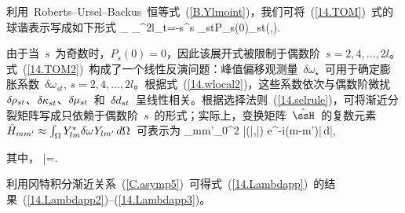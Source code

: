 利用~Roberts--Ursel--Backus~恒等式~(\ref{B.Ylmoint})，我们可将~(\ref{14.TOM})~式的球谐表示写成如下形式
\eq \label{14.TOM2}
\delta\omega_{\star}\approx
\sum_{}^{2l}\sum_{t=-s}^s
\delta\omega_{st}P_s(0)\sY_{st}(\otheta,\ophi).
\en

由于当~$s$~为奇数时，$P_s(0)=0$，因此该展开式被限制于偶数阶~$s=2,4,\ldots,2l$。式~(\ref{14.TOM2})~构成了一个线性反演问题：峰值偏移观测量~$\delta\omega_{\star}$~可用于确定膨胀系数~$\delta\omega_{st}$, $s=2,4,\ldots,2l$。根据式~(\ref{14.wlocal2})，这些系数依次与偶数阶微扰~$\delta\hspace{-0.2 mm}\rho_{st}$、$\delta\hspace{-0.1 mm}\kappa_{st}$、$\delta\hspace{-0.2 mm}
\mu_{st}$~和~$\delta\hspace{-0.1 mm}d_{st}$~呈线性相关。根据选择法则~(\ref{14.selrule})，可将渐近分裂矩阵写成只依赖于偶数阶~$s$~的形式；实际上，变换矩阵~$\tilde{\ssH}$~的复数元素~$\tilde{H}_{mm'}\approx\int_{\Omega}Y_{lm}^*
\delta\omega\hspace{0.3 mm}Y_{lm'}\,d\Omega$~可表示为
\eq \label{14.Lambdapp2}
_{mm'}\approx{}\int_0^{2\pi}
\delta\bar{\om}(\bar{\theta},\bar{\phi})
e^{-i(m-m')\bar{\phi}}\,d\bar{\phi},
\en

其中，
\eq \label{14.Lambdapp3}
\cos\bar{\theta}=.
\en

利用冈特积分渐近关系~(\ref{C.asymp5})~可得式~(\ref{14.Lambdapp})~的结果~(\ref{14.Lambdapp2})--(\ref{14.Lambdapp3})。

